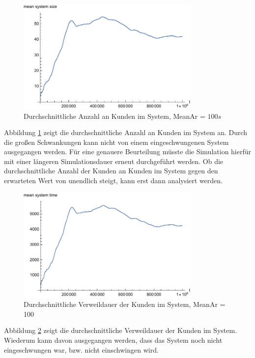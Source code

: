 \begin{figure}[htpb]
	\centering
	\includegraphics[width=0.8\textwidth]{abbildungen/1_Phone/Arrival_100_Serve_100_dur_1000000_Skip_0/MeanSystemSize.pdf}
	\caption{Durchschnittliche Anzahl an Kunden im System, MeanAr = $100s$}
	\label{fig:meanSystemSize100}
\end{figure}

Abbildung \ref{fig:meanSystemSize100} zeigt die durchschnittliche Anzahl an Kunden im System an. Durch die großen Schwankungen kann nicht von einem eingeschwungenen System ausgegangen werden. Für eine genauere Beurteilung müsste die Simulation hierfür mit einer längeren Simulationsdauer erneut durchgeführt werden. Ob die durchschnittliche Anzahl der Kunden an Kunden im System gegen den erwarteten Wert von unendlich steigt, kann erst dann analysiert werden.

\begin{figure}[htpb]
	\centering
	\includegraphics[width=0.8\textwidth]{abbildungen/1_Phone/Arrival_100_Serve_100_dur_1000000_Skip_0/MeanSystemTime.pdf}
	\caption{Durchschnittliche Verweildauer der Kunden im System, MeanAr = 100}
	\label{fig:meanSystemTime100}
\end{figure}

Abbildung \ref{fig:meanSystemTime100} zeigt die durchschnittliche Verweildauer der Kunden im System. Wiederum kann davon ausgegangen werden, dass das System noch nicht eingeschwungen war, bzw. nicht einschwingen wird. 

